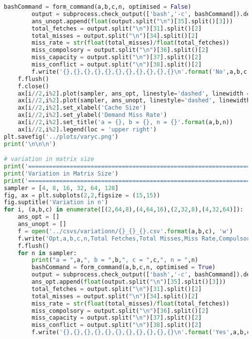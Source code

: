 \documentclass[12pt, a4paper]{article}
\begin{document}
\begin{lstlisting}[language=Python]
		bashCommand = form_command(a,b,c,n, optimised = False)
		output = subprocess.check_output(['bash','-c', bashCommand]).decode('utf8')
		ans_unopt.append(float(output.split("\n")[35].split()[3]))
		total_fetches = output.split("\n")[31].split()[2]
		total_misses = output.split("\n")[34].split()[2]
		miss_rate = str(float(total_misses)/float(total_fetches))
		miss_compolsory = output.split("\n")[36].split()[2]
		miss_capacity = output.split("\n")[37].split()[2]
		miss_conflict = output.split("\n")[38].split()[2]
		f.write('{},{},{},{},{},{},{},{},{},{},{}\n'.format('No',a,b,c,n,total_fetches,total_misses,miss_rate,miss_compolsory,miss_conflict,miss_capacity))
	f.flush()
	f.close()
	ax[i//2,i%2].plot(sampler, ans_opt, linestyle='dashed', linewidth = 2, marker='o', markersize=4,label='optimised')
	ax[i//2,i%2].plot(sampler, ans_unopt, linestyle='dashed', linewidth = 2, marker='o', markersize=4,label='unoptimised')
	ax[i//2,i%2].set_xlabel('Cache Size')
	ax[i//2,i%2].set_ylabel('Demand Miss Rate')
	ax[i//2,i%2].set_title('a = {}, b = {}, n = {}'.format(a,b,n))
	ax[i//2,i%2].legend(loc = 'upper right')
plt.savefig('../plots/varyc.png')
print('\n\n\n')

# variation in matrix size
print('==============================================================================')
print('Variation in Matrix Size')
print('==============================================================================')
sampler = [4, 8, 16, 32, 64, 128]
fig, ax = plt.subplots(2,2,figsize = (15,15))
fig.suptitle('Variation in n')
for i, (a,b,c) in enumerate([(2,64,8),(4,64,16),(2,32,8),(4,32,64)]):
	ans_opt = []
	ans_unopt = []
	f = open('../csvs/variationn/{}_{}_{}.csv'.format(a,b,c), 'w')
	f.write('Opt,a,b,c,n,Total Fetches,Total Misses,Miss Rate,Compulsory miss, Conflict miss, Capacity miss\n')
	f.flush()
	for n in sampler:
		print("a = ",a,", b = ",b,", c = ",c,", n = ",n)
		bashCommand = form_command(a,b,c,n, optimised = True)
		output = subprocess.check_output(['bash','-c', bashCommand]).decode('utf8')
		ans_opt.append(float(output.split("\n")[35].split()[3]))
		total_fetches = output.split("\n")[31].split()[2]
		total_misses = output.split("\n")[34].split()[2]
		miss_rate = str(float(total_misses)/float(total_fetches))
		miss_compolsory = output.split("\n")[36].split()[2]
		miss_capacity = output.split("\n")[37].split()[2]
		miss_conflict = output.split("\n")[38].split()[2]
		f.write('{},{},{},{},{},{},{},{},{},{},{}\n'.format('Yes',a,b,c,n,total_fetches,total_misses,miss_rate,miss_compolsory,miss_conflict,miss_capacity))


\end{lstlisting}
\end{document}
